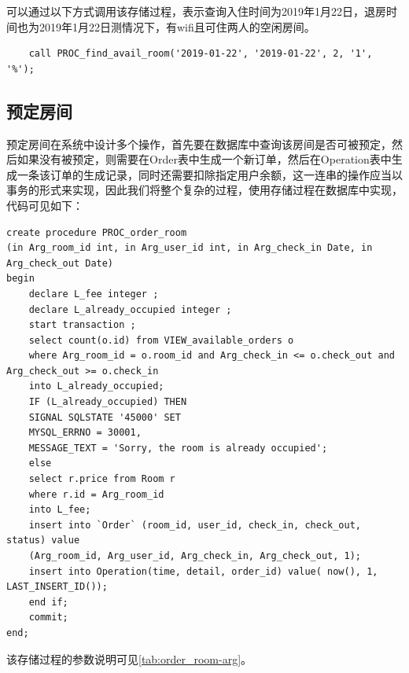 \documentclass{myreport}
\begin{document}
可以通过以下方式调用该存储过程，表示查询入住时间为2019年1月22日，退房时间也为2019年1月22日测情况下，有wifi且可住两人的空闲房间。

\begin{verbatim}
    call PROC_find_avail_room('2019-01-22', '2019-01-22', 2, '1', '%');
\end{verbatim}

\subsection{预定房间}

预定房间在系统中设计多个操作，首先要在数据库中查询该房间是否可被预定，然后如果没有被预定，则需要在Order表中生成一个新订单，然后在Operation表中生成一条该订单的生成记录，同时还需要扣除指定用户余额，这一连串的操作应当以事务的形式来实现，因此我们将整个复杂的过程，使用存储过程在数据库中实现，代码可见如下：

\begin{verbatim}
create procedure PROC_order_room
(in Arg_room_id int, in Arg_user_id int, in Arg_check_in Date, in Arg_check_out Date)
begin
    declare L_fee integer ;
    declare L_already_occupied integer ;
    start transaction ;
    select count(o.id) from VIEW_available_orders o
    where Arg_room_id = o.room_id and Arg_check_in <= o.check_out and Arg_check_out >= o.check_in
    into L_already_occupied;
    IF (L_already_occupied) THEN
    SIGNAL SQLSTATE '45000' SET
    MYSQL_ERRNO = 30001,
    MESSAGE_TEXT = 'Sorry, the room is already occupied';
    else
    select r.price from Room r
    where r.id = Arg_room_id
    into L_fee;
    insert into `Order` (room_id, user_id, check_in, check_out, status) value
    (Arg_room_id, Arg_user_id, Arg_check_in, Arg_check_out, 1);
    insert into Operation(time, detail, order_id) value( now(), 1, LAST_INSERT_ID());
    end if;
    commit;
end;
\end{verbatim}

该存储过程的参数说明可见\autoref{tab:order_room-arg}。
\end{document}
